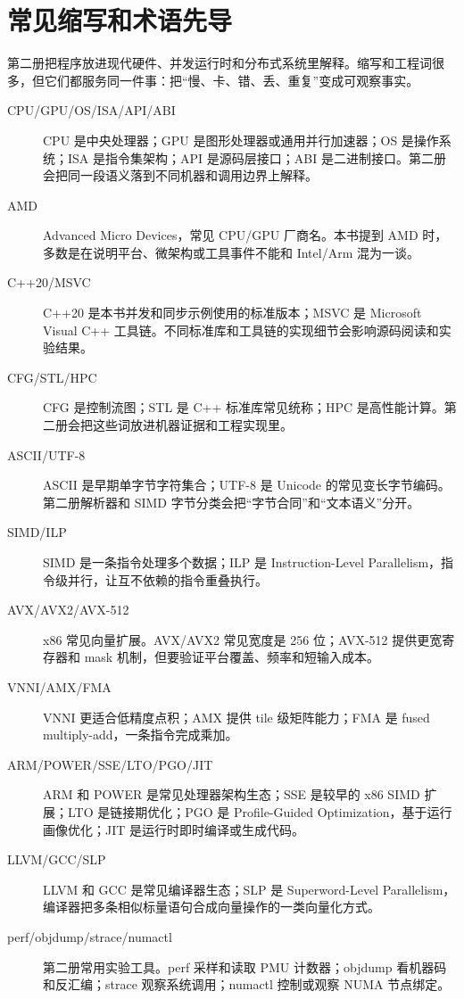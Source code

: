 \chapter*{常见缩写和术语先导}

第二册把程序放进现代硬件、并发运行时和分布式系统里解释。缩写和工程词很多，但它们都服务同一件事：把“慢、卡、错、丢、重复”变成可观察事实。

\begin{description}
  \item[CPU/GPU/OS/ISA/API/ABI] CPU 是中央处理器；GPU 是图形处理器或通用并行加速器；OS 是操作系统；ISA 是指令集架构；API 是源码层接口；ABI 是二进制接口。第二册会把同一段语义落到不同机器和调用边界上解释。
  \item[AMD] Advanced Micro Devices，常见 CPU/GPU 厂商名。本书提到 AMD 时，多数是在说明平台、微架构或工具事件不能和 Intel/Arm 混为一谈。
  \item[C++20/MSVC] C++20 是本书并发和同步示例使用的标准版本；MSVC 是 Microsoft Visual C++ 工具链。不同标准库和工具链的实现细节会影响源码阅读和实验结果。
  \item[CFG/STL/HPC] CFG 是控制流图；STL 是 C++ 标准库常见统称；HPC 是高性能计算。第二册会把这些词放进机器证据和工程实现里。
  \item[ASCII/UTF-8] ASCII 是早期单字节字符集合；UTF-8 是 Unicode 的常见变长字节编码。第二册解析器和 SIMD 字节分类会把“字节合同”和“文本语义”分开。
  \item[SIMD/ILP] SIMD 是一条指令处理多个数据；ILP 是 Instruction-Level Parallelism，指令级并行，让互不依赖的指令重叠执行。
  \item[AVX/AVX2/AVX-512] x86 常见向量扩展。AVX/AVX2 常见宽度是 256 位；AVX-512 提供更宽寄存器和 mask 机制，但要验证平台覆盖、频率和短输入成本。
  \item[VNNI/AMX/FMA] VNNI 更适合低精度点积；AMX 提供 tile 级矩阵能力；FMA 是 fused multiply-add，一条指令完成乘加。
  \item[ARM/POWER/SSE/LTO/PGO/JIT] ARM 和 POWER 是常见处理器架构生态；SSE 是较早的 x86 SIMD 扩展；LTO 是链接期优化；PGO 是 Profile-Guided Optimization，基于运行画像优化；JIT 是运行时即时编译或生成代码。
  \item[LLVM/GCC/SLP] LLVM 和 GCC 是常见编译器生态；SLP 是 Superword-Level Parallelism，编译器把多条相似标量语句合成向量操作的一类向量化方式。
  \item[perf/objdump/strace/numactl] 第二册常用实验工具。perf 采样和读取 PMU 计数器；objdump 看机器码和反汇编；strace 观察系统调用；numactl 控制或观察 NUMA 节点绑定。

\end{description}
